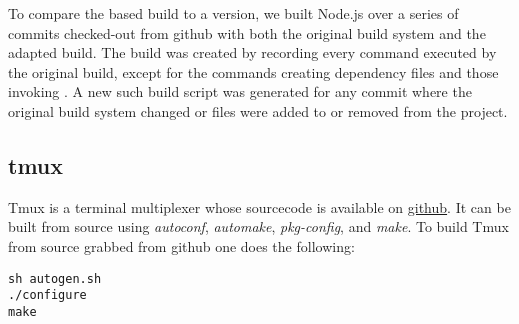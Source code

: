 To compare the \Make based build to a \Rattle version, we built Node.js over a series of commits checked-out from github with both the original build system and the adapted \Rattle build.  The \Rattle build was created by recording every command executed by the original build, except for the commands creating dependency files and those invoking \Make.  A new such \Rattle build script was generated for any commit where the original build system changed or files were added to or removed from the project.










\subsection{tmux}

Tmux is a terminal multiplexer whose sourcecode is available on  \href{``https://github.com/vim/vim''}{github}.  It can be built from source using \emph{autoconf}, \emph{automake}, \emph{pkg-config}, and \emph{make}.  To build Tmux from source grabbed from github one does the following:

\begin{verbatim}
sh autogen.sh
./configure
make
\end{verbatim}

